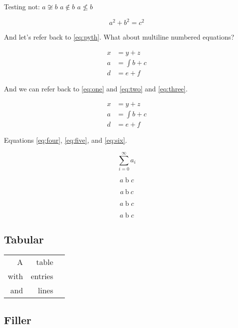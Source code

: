 \documentclass[
  text,
  xhtml,
  itex
]{internet}
\begin{document}
Testing not: \(a \not\cong b\) \(a \not\in b\) \(a \not\le b\)

\begin{equation}
\label{eq:pyth}
a^2 + b^2 = c^2
\end{equation}

And let's refer back to \ref{eq:pyth}.
What about multiline numbered equations?

\begin{align}
\label{eq:one}
x &= y + z \\
\label{eq:two}
a &= \int b + c \\
\label{eq:three}
d &= e + f
\end{align}

And we can refer back to \ref{eq:one} and \ref{eq:two} and \ref{eq:three}.

\begin{align}
\label{eq:four}
x &= y + z \\
\nonumber
\label{eq:five}
a &= \int b + c \\
\label{eq:six}
d &= e + f
\end{align}

Equations \ref{eq:four}, \ref{eq:five}, and \ref{eq:six}.

\begin{equation}
\sum_{i = 0}^\infty a_i
\end{equation}

\[
  a\mathbin{b}c
\]

\[
  a\:\mathrm{b}\:c
\]

\[
  a\mathrel{b}c
\]

\[
  a\;\mathrm{b}\;c
\]

\subsection{Tabular}

\begin{tabular}{rrr}
A & table \\
with & entries \\ \hline
and & lines
\end{tabular}

\subsection{Filler}

\lipsum
\end{document}
